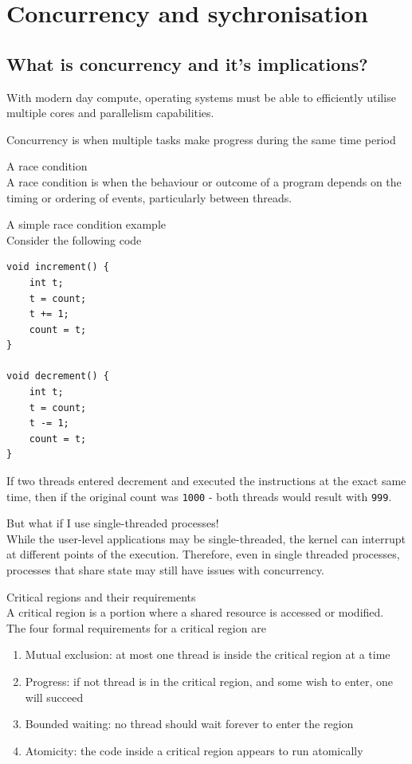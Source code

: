 \documentclass[journal, letterpaper]{IEEEtran}
\begin{document}
\section{Concurrency and sychronisation}
\subsection{What is concurrency and it's implications?}
With modern day compute, operating systems must be able to efficiently utilise multiple cores and parallelism capabilities.
\begin{center}
    Concurrency is when multiple tasks make progress during the same time period
\end{center}
\begin{theory}{A race condition} \\
    A race condition is when the behaviour or outcome of a program depends on the timing or ordering of events, particularly between threads.
\end{theory}
\begin{example}{A simple race condition example} \\ 
    Consider the following code 
\begin{verbatim}
void increment() {
    int t;
    t = count;
    t += 1;
    count = t;
}

void decrement() {
    int t;
    t = count;
    t -= 1;
    count = t;
}
\end{verbatim}
If two threads entered decrement and executed the instructions at the exact same time, then if the original count was \verb|1000| - both threads would result with \verb|999|.
\end{example}
\begin{aside}{But what if I use single-threaded processes!} \\ 
    While the user-level applications may be single-threaded, the kernel can interrupt at different points of the execution.
    \newline 
    Therefore, even in single threaded processes, processes that share state may still have issues with concurrency.
\end{aside}
\begin{theory}{Critical regions and their requirements} \\
    A critical region is a portion where a shared resource is accessed or modified.
    \newline \\
    The four formal requirements for a critical region are
    \begin{enumerate}
        \item Mutual exclusion: at most one thread is inside the critical region at a time 
        \item Progress: if not thread is in the critical region, and some wish to enter, one will succeed
        \item Bounded waiting: no thread should wait forever to enter the region
        \item Atomicity: the code inside a critical region appears to run atomically
    \end{enumerate}
\end{theory}
\end{document}
